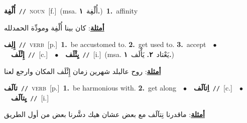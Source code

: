 \documentclass[10pt,a4paper,twoside]{article} %
\begin{document}
\begin{multicols}{2}
{\setlength\topsep{0pt}\textbf{\foreignlanguage{arabic}{أُلْفِة}}\ {\color{gray}\texttt{//}\color{black}}\ \textsc{noun}\ [f.]\ \color{gray}(msa. \foreignlanguage{arabic}{أُلْفِة}~\foreignlanguage{arabic}{\textbf{١.}})\color{black}\ \textbf{1.}~affinity\  \begin{flushright}\color{gray}\foreignlanguage{arabic}{\textbf{\underline{\foreignlanguage{arabic}{أمثلة}}}: كان بينا أُلْفِة ومودِّة الحمدلله}\end{flushright}\color{black}} \vspace{2mm}

{\setlength\topsep{0pt}\textbf{\foreignlanguage{arabic}{إِلِف}}\ {\color{gray}\texttt{//}\color{black}}\ \textsc{verb}\ [p.]\ \textbf{1.}~be accustomed to.  \textbf{2.}~get used to.  \textbf{3.}~accept\ \ $\bullet$\ \ \setlength\topsep{0pt}\textbf{\foreignlanguage{arabic}{إِئْلَف}}\ {\color{gray}\texttt{//}\color{black}}\ [c.]\ \ $\bullet$\ \ \setlength\topsep{0pt}\textbf{\foreignlanguage{arabic}{يِئْلَف}}\ {\color{gray}\texttt{//}\color{black}}\ [i.]\ \color{gray}(msa. \foreignlanguage{arabic}{يَعْتاد}~\foreignlanguage{arabic}{\textbf{٢.}}  \foreignlanguage{arabic}{يَأْلَف}~\foreignlanguage{arabic}{\textbf{١.}})\color{black}\  \begin{flushright}\color{gray}\foreignlanguage{arabic}{\textbf{\underline{\foreignlanguage{arabic}{أمثلة}}}: روح عالبلد شهرين زمان إِئْلَف المكان وارجع لعنا}\end{flushright}\color{black}} \vspace{2mm}

{\setlength\topsep{0pt}\textbf{\foreignlanguage{arabic}{تآلَف}}\ {\color{gray}\texttt{//}\color{black}}\ \textsc{verb}\ [p.]\ \textbf{1.}~be harmonious with.  \textbf{2.}~get along\ \ $\bullet$\ \ \setlength\topsep{0pt}\textbf{\foreignlanguage{arabic}{اِتآلَف}}\ {\color{gray}\texttt{//}\color{black}}\ [c.]\ \ $\bullet$\ \ \setlength\topsep{0pt}\textbf{\foreignlanguage{arabic}{يِتآلَف}}\ {\color{gray}\texttt{//}\color{black}}\ [i.]\  \begin{flushright}\color{gray}\foreignlanguage{arabic}{\textbf{\underline{\foreignlanguage{arabic}{أمثلة}}}: ماقدرنا نِتآلَف مع بعض عشان هيك دشَّرنا بعض من أول الطريق}\end{flushright}\color{black}} \vspace{2mm}


\end{multicols}
\end{document}
